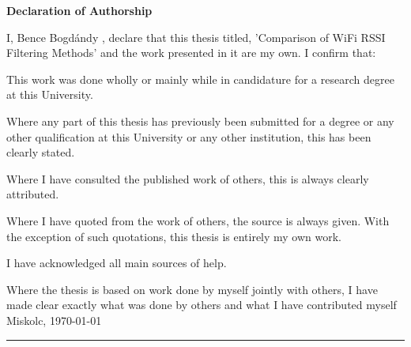 \documentclass[13pt, a4paper, oneside]{Thesis} %
\begin{document}
\thispagestyle{empty}
{}
\begin{center}{\huge\bf Declaration    of    Authorship\par}\end{center}




I,
Bence Bogdándy
,
declare
that
this
thesis
titled,
'Comparison of WiFi RSSI Filtering Methods'
and
the
work
presented
in
it
are
my
own.
I
confirm
that:


This
work
was
done
wholly
or
mainly
while
in
candidature
for
a
research
degree
at
this
University.



Where
any
part
of
this
thesis
has
previously
been
submitted
for
a
degree
or
any
other
qualification
at
this
University
or
any
other
institution,
this
has
been
clearly
stated.


Where
I
have
consulted
the
published
work
of
others,
this
is
always
clearly
attributed.


Where
I
have
quoted
from
the
work
of
others,
the
source
is
always
given.
With
the
exception
of
such
quotations,
this
thesis
is
entirely
my
own
work.


I
have
acknowledged
all
main
sources
of
help.


Where
the
thesis
is
based
on
work
done
by
myself
jointly
with
others,
I
have
made
clear
exactly
what
was
done
by
others
and
what
I
have
contributed
myself
Miskolc, \today \\

\vspace{2cm}
\begin{minipage}{0.4\textwidth}
\begin{center}
\rule{5cm}{0.5mm} \\
\authornames
\end{center}
\end{minipage}

\clearpage %

\tableofcontents
\newpage







\appendix





\end{document}
